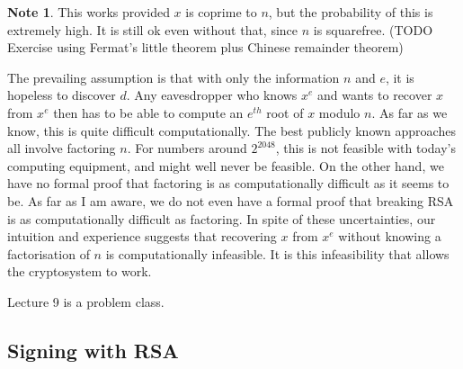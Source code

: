 \documentclass{article}
\theoremstyle{definition}\newtheorem{definition}{Definition}
\theoremstyle{definition}\newtheorem{remark}[definition]{Remark}
\theoremstyle{definition}\newtheorem*{example}{Example}
\theoremstyle{definition}\newtheorem*{note}{Note}
\begin{document}
\begin{note}
This works provided $ x $ is coprime to $ n $, but the probability of this is extremely high. It is still ok even without that, since $ n $ is squarefree. (TODO Exercise using Fermat's little theorem plus Chinese remainder theorem)
\end{note}

The prevailing assumption is that with only the information $ n $ and $ e $, it is hopeless to discover $ d $. Any eavesdropper who knows $ x^e $ and wants to recover $ x $ from $ x^e $ then has to be able to compute an $ e^{th} $ root of $ x $ modulo $ n $. As far as we know, this is quite difficult computationally. The best publicly known approaches all involve factoring $ n $. For numbers around $ 2^{2048} $, this is not feasible with today's computing equipment, and might well never be feasible. On the other hand, we have no formal proof that factoring is as computationally difficult as it seems to be. As far as I am aware, we do not even have a formal proof that breaking RSA is as computationally difficult as factoring. In spite of these uncertainties, our intuition and experience suggests that recovering $ x $ from $ x^e $ without knowing a factorisation of $ n $ is computationally infeasible. It is this infeasibility that allows the cryptosystem to work.


Lecture 9 is a problem class.


\subsection{Signing with RSA}
\end{document}
